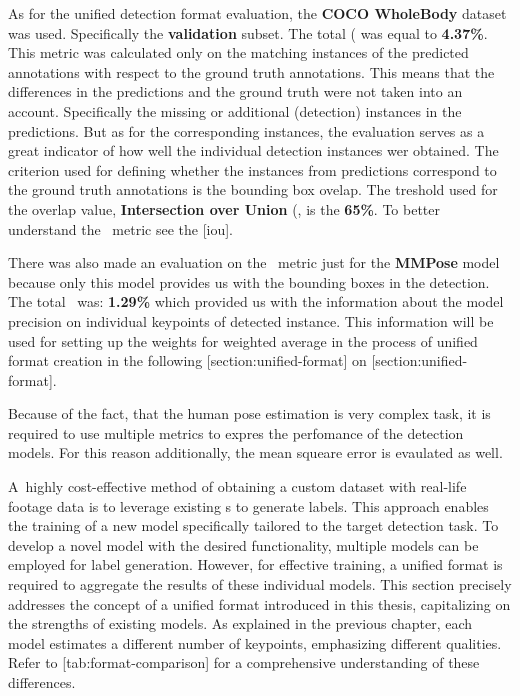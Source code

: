 As for the unified detection format evaluation, the {\bf COCO WholeBody} dataset was used. Specifically the {\bf validation} subset. The total (\APE\) was equal to {\bf 4.37\%}. This metric was calculated only on the matching instances of the predicted annotations with respect to the ground truth annotations. This means that the differences in the predictions and the ground truth were not taken into an account. Specifically the missing or additional (detection) instances in the predictions. But as for the corresponding instances, the evaluation serves as a great indicator of how well the individual detection instances wer obtained. The criterion used for defining whether the instances from predictions correspond to the ground truth annotations is the bounding box ovelap. The treshold used for the overlap value, {\bf Intersection over Union} (\IoU\), is the {\bf 65\%}. To better understand the \IoU\ metric see the [iou].


There was also made an evaluation on the \APE\ metric just for the {\bf MMPose} model because only this model provides us with the bounding boxes in the detection. The total \APE\ was: {\bf 1.29\%} which provided us with the information about the model precision on individual keypoints of detected instance. This information will be used for setting up the weights for weighted average in the process of unified format creation in the following [section:unified-format] on [section:unified-format].

Because of the fact, that the human pose estimation is very complex task, it is required to use multiple metrics to expres the perfomance of the detection models. For this reason additionally, the mean squeare error is evaulated as well.

A~highly cost-effective method of obtaining a custom dataset with real-life footage data is to leverage existing \NN\-s to generate labels. This approach enables the training of a new model specifically tailored to the target detection task. To develop a novel model with the desired functionality, multiple models can be employed for label generation. However, for effective training, a unified format is required to aggregate the results of these individual models. This section precisely addresses the concept of a unified format introduced in this thesis, capitalizing on the strengths of existing models. As explained in the previous chapter, each model estimates a different number of keypoints, emphasizing different qualities. Refer to [tab:format-comparison] for a comprehensive understanding of these differences.

